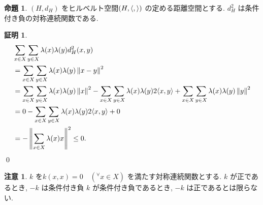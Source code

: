 \documentclass[10pt, fleqn, label-section=none]{bxjsarticle}
\theoremstyle{definition}
\newtheorem{prop}[dfn]{命題}
\newtheorem*{pf*}{証明}
\newtheorem{remark}[dfn]{注意}
\newcommand{\any}{{}^{\forall}}
\newcommand{\tbra}[1]{\mleft\langle#1\mright\rangle}
\newcommand{\norm}[1]{\left\|#1\right\|}
\renewcommand{\;}{\, ; \,}
\begin{document}
\begin{prop}$(H, d_H)$ をヒルベルト空間$(H, \tbra{, })$ の定める距離空間とする.  $d^2_H$ は条件付き負の対称連続関数である. 

\end{prop}
\begin{pf*}



\begin{align*} &\sum_{x \in X}\sum_{y \in X} \lambda(x) \lambda (y) d^2_H(x, y) \\&= \sum_{x \in X}\sum_{y \in X} \lambda(x) \lambda (y)\norm{x - y}^2 
\\&=  \sum_{x \in X}\sum_{y \in X}\lambda(x) \lambda (y)  \norm x ^2 - \sum_{x \in X}\sum_{y \in X}\lambda(x) \lambda (y)  2\tbra{x, y} + \sum_{x \in X}\sum_{y \in X} \lambda(x) \lambda (y) \norm y^2 
\\&= 0 - \sum_{x \in X}\sum_{y \in X}   \lambda(x) \lambda (y)  2\tbra{x, y}  + 0 
\\&= - \norm{\sum_{x \in X} \lambda (x) x } ^2 \leq 0.  \end{align*}
\qed
\end{pf*}

\begin{remark}$k$ を$k(x, x) = 0 \quad (\any x \in X)$ を満たす対称連続関数とする. $k$ が正であるとき, $-k$ は条件付き負 $k$ が条件付き負であるとき, $- k$ は正であるとは限らない.

\end{remark}
\end{document}
